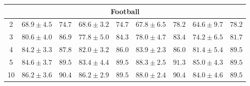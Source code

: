 \documentclass{article}
\begin{document}
\begin{table}
\begin{tabular}{|c|cccc|cccc|}
        \hline
        \multicolumn{9}{|c|}{Football} \\
        \hline
        2&$68.9 \pm 4.5$&$74.7$&$68.6 \pm 3.2$&$74.7$&$67.8 \pm 6.5$&$78.2$&$64.6 \pm9.7$&$78.2$\\ \hline
        3&$80.6 \pm 4.0$&$86.9$&$77.8 \pm 5.0$&$84.3$&$78.0 \pm 4.7$&$83.4$&$74.2 \pm6.5$&$81.7$\\ \hline
        4&$84.2 \pm 3.3$&$87.8$&$82.0 \pm 3.2$&$86.0$&$83.9 \pm 2.3$&$86.0$&$81.4 \pm5.4$&$89.5$\\ \hline
        5&$84.6 \pm 3.7$&$89.5$&$83.4 \pm 4.4$&$89.5$&$88.3 \pm 2.5$&$91.3$&$85.0 \pm4.3$&$89.5$\\ \hline
        10&$86.2 \pm 3.6$&$90.4$&$86.2 \pm 2.9$&$89.5$&$88.0 \pm 2.4$&$90.4$&$84.0 \pm4.6$&$89.5$\\ \hline
  \end{tabular}
\end{table}
\end{document}
